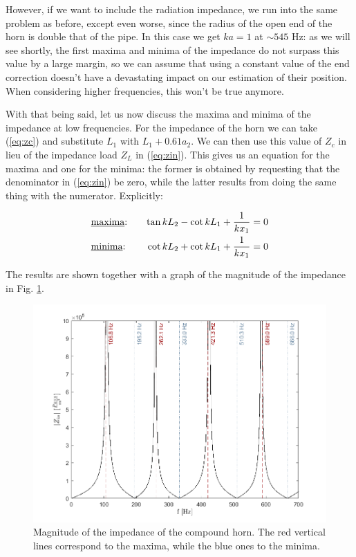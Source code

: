 \documentclass[a4paper]{article}
\begin{document}
However, if we want to include the radiation impedance, we run into the same problem as before, except even worse, since the radius of the open end of the horn is double that of the pipe. In this case we get $ka = 1$ at $\sim 545$ Hz: as we will see shortly, the first maxima and minima of the impedance do not surpass this value by a large margin, so we can assume that using a constant value of the end correction doesn't have a devastating impact on our estimation of their position. When considering higher frequencies, this won't be true anymore.

With that being said, let us now discuss the maxima and minima of the impedance at low frequencies. For the impedance of the horn we can take (\ref{eq:zc}) and substitute $L_1$ with $L_1 + 0.61a_2 $. We can then use this value of $Z_c$ in lieu of the impedance load $Z_L$ in (\ref{eq:zin}). This gives us an equation for the maxima and one for the minima: the former is obtained by requesting that the denominator in (\ref{eq:zin}) be zero, while the latter results from doing the same thing with the numerator. Explicitly:

\begin{align*}
	&\text{\underline{maxima}:} \quad & \tan{kL_2} - \cot{kL_1} + \frac{1}{kx_1} = 0\\
	&\text{\underline{minima}:} \quad & \cot{kL_2} + \cot{kL_1} + \frac{1}{kx_1} = 0
\end{align*}

The results are shown together with a graph of the magnitude of the impedance in Fig. \ref{fig:maxmin}.

\begin{figure}[h!]
	\centering
	\includegraphics[width=0.8\linewidth]{maxmin.png}
	\caption{Magnitude of the impedance of the compound horn. The red vertical lines correspond to the maxima, while the blue ones to the minima.}
	\label{fig:maxmin}
\end{figure}
\end{document}
